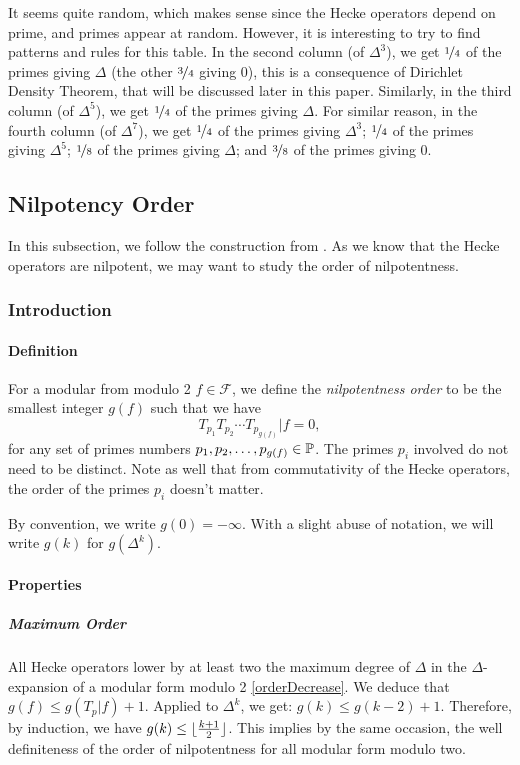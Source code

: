 It seems quite random, which makes sense since the Hecke operators depend on prime, and primes appear at random.
However, it is interesting to try to find patterns and rules for this table.
In the second column (of $\Delta^3$), we get $\nicefrac{1}{4}$ of the primes giving $\Delta$ (the other $\nicefrac{3}{4}$ giving $0$), this is a consequence of Dirichlet Density Theorem, that will be discussed later in this paper.
Similarly, in the third column (of $\Delta^5$), we get $\nicefrac{1}{4}$ of the primes giving $\Delta$.
For similar reason, in the fourth column (of $\Delta^7$), we get $\nicefrac{1}{4}$ of the primes giving $\Delta^3$; $\nicefrac{1}{4}$ of the primes giving $\Delta^5$; $\nicefrac{1}{8}$ of the primes giving $\Delta$; and $\nicefrac{3}{8}$ of the primes giving $0$.



\subsection{Nilpotency Order}
In this subsection, we follow the construction from \cite{OrdreNilpotenceOperateurHecke}.
As we know that the Hecke operators are nilpotent, we may want to study the order of nilpotentness.
\subsubsection{Introduction}
\paragraph{Definition}
For a modular from modulo 2 $f \in \mathcal{F}$, we define the \textit{nilpotentness order} to be the smallest integer $g(f)$ such that we have 
$$
T_{p_1} T_{p_2} \cdots T_{p_{g(f)}} | f = 0,
$$
for any set of primes numbers $p_1, p_2, \dots, p_{g(f)} \in \mathbb{P}$.
The primes $p_i$ involved do not need to be distinct.
Note as well that from commutativity of the Hecke operators, the order of the primes $p_i$ doesn't matter.

By convention, we write $g(0)= -\infty$.
With a slight abuse of notation, we will write $g(k)$ for $g(\Delta^k)$.

\paragraph{Properties}
\subparagraph[Well-definiteness]{Maximum Order}
\label{MaximumOrderNilpotencyHeckeOperators}
All Hecke operators lower by at least two the maximum degree of $\Delta$ in the $\Delta$-expansion of a modular form modulo 2 \ref{orderDecrease}.
We deduce that $g(f) \leq g(T_p|f) + 1$.
Applied to $\Delta^k$, we get: $g(k) \leq g(k-2) + 1$.
Therefore, by induction, we have $g(k) \leq \lfloor \frac{k+1}{2} \rfloor$.
This implies by the same occasion, the well definiteness of the order of nilpotentness for all modular form modulo two.

